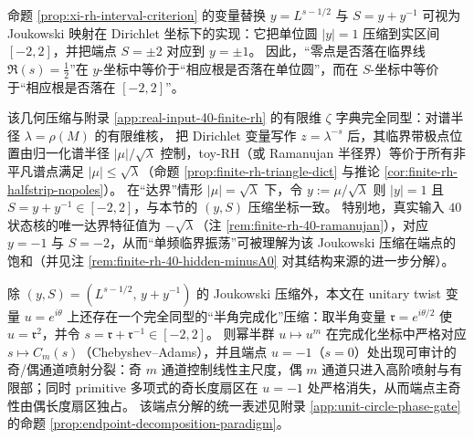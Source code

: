 \begin{remark}\label{rem:xi-joukowski-toy-rh-alignment}
命题 \ref{prop:xi-rh-interval-criterion} 的变量替换
\(
y=L^{s-1/2}
\)
与
\(
S=y+y^{-1}
\)
可视为 Joukowski 映射在 Dirichlet 坐标下的实现：它把单位圆 \(|y|=1\) 压缩到实区间 \([-2,2]\)，并把端点
\(
S=\pm 2
\)
对应到
\(
y=\pm 1
\)。
因此，“零点是否落在临界线 \(\Re(s)=\tfrac12\)”在 \(y\)-坐标中等价于“相应根是否落在单位圆”，而在 \(S\)-坐标中等价于“相应根是否落在 \([-2,2]\)”。
\par
该几何压缩与附录 \ref{app:real-input-40-finite-rh} 的有限维 \(\zeta\) 字典完全同型：对谱半径 \(\lambda=\rho(M)\) 的有限维核，
把 Dirichlet 变量写作 \(z=\lambda^{-s}\) 后，其临界带极点位置由归一化谱半径
\(
|\mu|/\sqrt{\lambda}
\)
控制，toy-RH（或 Ramanujan 半径界）等价于所有非平凡谱点满足 \(|\mu|\le \sqrt{\lambda}\)（命题 \ref{prop:finite-rh-triangle-dict} 与推论 \ref{cor:finite-rh-halfstrip-nopoles}）。
在“达界”情形 \(|\mu|=\sqrt{\lambda}\) 下，令
\(
y:=\mu/\sqrt{\lambda}
\)
则 \(|y|=1\) 且 \(S=y+y^{-1}\in[-2,2]\)，与本节的 \((y,S)\) 压缩坐标一致。
特别地，真实输入 \(40\) 状态核的唯一达界特征值为 \(-\sqrt{\lambda}\)（注 \ref{rem:finite-rh-40-ramanujan}），对应 \(y=-1\) 与 \(S=-2\)，从而“单频临界振荡”可被理解为该 Joukowski 压缩在端点的饱和（并见注 \ref{rem:finite-rh-40-hidden-minusA0} 对其结构来源的进一步分解）。
\end{remark}

\begin{remark}\label{rem:xi-half-angle-endpoint-paradigm}
除 \((y,S)=(L^{s-1/2},\,y+y^{-1})\) 的 Joukowski 压缩外，本文在 unitary twist 变量 \(u=e^{i\theta}\) 上还存在一个完全同型的“半角完成化”压缩：取半角变量 \(\mathfrak{r}=e^{i\theta/2}\) 使 \(u=\mathfrak{r}^2\)，并令 \(s=\mathfrak{r}+\mathfrak{r}^{-1}\in[-2,2]\)。
则幂半群 \(u\mapsto u^m\) 在完成化坐标中严格对应 \(s\mapsto C_m(s)\)（Chebyshev--Adams），并且端点 \(u=-1\)（\(s=0\)）处出现可审计的奇/偶通道喷射分裂：奇 \(m\) 通道控制线性主尺度，偶 \(m\) 通道只进入高阶喷射与有限部；同时 primitive 多项式的奇长度扇区在 \(u=-1\) 处严格消失，从而端点主奇性由偶长度扇区独占。
该端点分解的统一表述见附录 \ref{app:unit-circle-phase-gate} 的命题 \ref{prop:endpoint-decomposition-paradigm}。
\end{remark}

